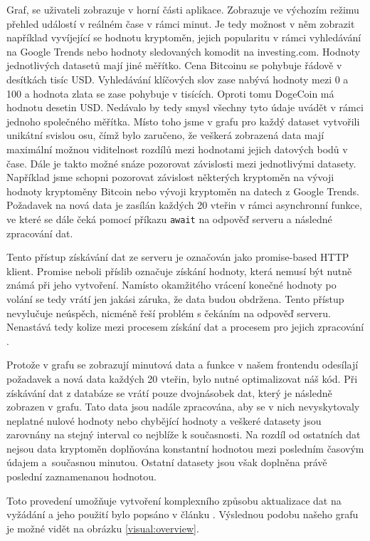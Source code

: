 Graf, se uživateli zobrazuje v horní části aplikace. Zobrazuje ve výchozím režimu přehled událostí v reálném čase v rámci minut. 
Je tedy možnost v něm zobrazit například vyvíjející se hodnotu kryptoměn, jejich popularitu v rámci vyhledávání na Google Trends nebo hodnoty sledovaných komodit na investing.com. 
Hodnoty jednotlivých datasetů mají jiné měřítko. 
Cena Bitcoinu se pohybuje řádově v desítkách tisíc USD. 
Vyhledávání klíčových slov zase nabývá hodnoty mezi 0 a 100 a hodnota zlata se zase pohybuje v tisících. 
Oproti tomu DogeCoin má hodnotu desetin USD. 
Nedávalo by tedy smysl všechny tyto údaje uvádět v rámci jednoho společného měřítka. 
Místo toho jsme v grafu pro každý dataset vytvořili unikátní svislou osu, čímž bylo zaručeno, že veškerá zobrazená data mají maximální možnou viditelnost rozdílů mezi hodnotami jejich datových bodů v čase. 
Dále je takto možné snáze pozorovat závislosti mezi jednotlivými datasety. 
Například jsme schopni pozorovat závislost některých kryptoměn na vývoji hodnoty kryptoměny Bitcoin nebo vývoji kryptoměn na datech z Google Trends. 
Požadavek na nová data je zasílán každých 20 vteřin v rámci asynchronní funkce, ve které se dále čeká pomocí příkazu \verb|await| na odpověď serveru a následné zpracování dat. 

Tento přístup získávání dat ze serveru je označován jako promise-based HTTP klient. 
Promise neboli příslib označuje získání hodnoty, která nemusí být nutně známá při jeho vytvoření. 
Namísto okamžitého vrácení konečné hodnoty po volání se tedy vrátí jen jakási záruka, že data budou obdržena. 
Tento přístup nevylučuje neúspěch, nicméně řeší problém s čekáním na odpověď serveru. 
Nenastává tedy kolize mezi procesem získání dat a procesem pro jejich zpracování \cite{promise}.

Protože v grafu se zobrazují minutová data a funkce v našem frontendu odesílají požadavek a nová data každých 20 vteřin, bylo nutné optimalizovat náš kód. 
Při získávání dat z databáze se vrátí pouze dvojnásobek dat, který je následně zobrazen v grafu. Tato data jsou nadále zpracována, aby se v nich nevyskytovaly neplatné nulové hodnoty nebo chybějící hodnoty a veškeré datasety jsou zarovnány na stejný interval co nejblíže k současnosti.
Na rozdíl od ostatních dat nejsou data kryptoměn doplňována konstantní hodnotou mezi posledním časovým údajem a~současnou minutou. 
Ostatní datasety jsou však doplněna právě poslední zaznamenanou hodnotou.

Toto provedení umožňuje vytvoření komplexního způsobu aktualizace dat na vyžádání a jeho použití bylo popsáno v článku  \cite{chart}.
Výslednou podobu našeho grafu je možné vidět na obrázku \ref{visual:overview}.

